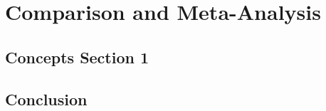 %
\chapter{Comparison and Meta-Analysis}
\label{sec:compare}

\section{Concepts Section 1}
\label{sec:compare:sec1}


\section{Conclusion}
\label{sec:compare:conclusion}
